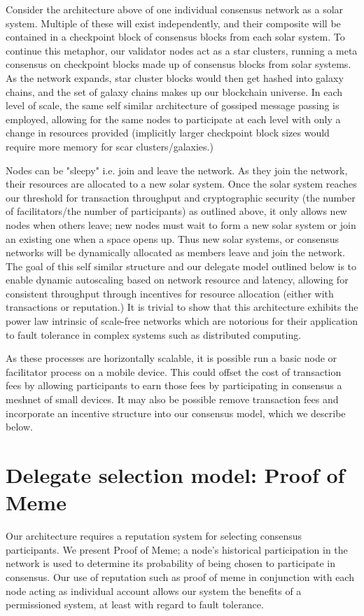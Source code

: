 \documentclass{article}
\begin{document}
Consider the architecture above of one individual consensus network as a solar system. Multiple of these will exist independently, and their composite will be contained in a checkpoint block of consensus blocks from each solar system. To continue this metaphor, our validator nodes act as a star clusters, running a meta consensus on checkpoint blocks made up of  consensus blocks from solar systems. As the network expands, star cluster blocks would then get hashed into galaxy chains, and the set of galaxy chains makes up our blockchain universe. In each level of scale, the same self similar architecture of gossiped message passing is employed, allowing for the same nodes to participate at each level with only a change in resources provided (implicitly larger checkpoint block sizes would require more memory for scar clusters/galaxies.)

Nodes can be "sleepy" i.e. join and leave the network. As they join the network, their resources are allocated to a new solar system. Once the solar system reaches our threshold for transaction throughput and cryptographic security (the number of facilitators/the number of participants) as outlined above, it only allows new nodes when others leave; new nodes must wait to form a new solar system or join an existing one when a space opens up. Thus new solar systems, or consensus networks will be dynamically allocated as members leave and join the network. The goal of this self similar structure and our delegate model outlined below is to enable dynamic autoscaling based on network resource and latency, allowing for consistent throughput through incentives for resource allocation (either with transactions or reputation.) It is trivial to show that this architecture exhibits the power law intrinsic of scale-free networks which are notorious for their application to fault tolerance in complex systems such as distributed computing.

As these processes are horizontally scalable, it is possible run a basic node or facilitator process on a mobile device. This could offset the cost of transaction fees by allowing participants to earn those fees by participating in consensus a meshnet of small devices. It may also be possible remove transaction fees and incorporate an incentive structure into our consensus model, which we describe below.

\section{Delegate selection model: Proof of Meme}
Our architecture requires a reputation system for selecting consensus participants. We present Proof of Meme; a node's historical participation in the network is used to determine its probability of being chosen to participate in consensus. Our use of reputation such as proof of meme in conjunction with each node acting as individual account allows our system the benefits of a permissioned system, at least with regard to fault tolerance.
\end{document}
